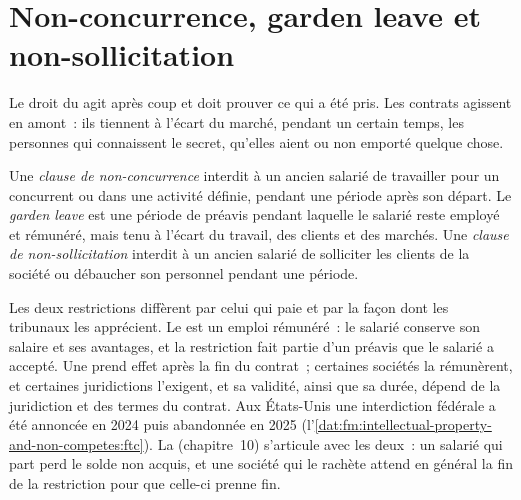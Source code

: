 \section{Non-concurrence, garden leave et non-sollicitation}

Le droit du  agit après coup et doit prouver ce qui a été pris. Les contrats agissent en amont~: ils tiennent à l'écart du
marché, pendant un certain temps, les personnes qui connaissent le secret, qu'elles aient ou non emporté quelque chose.

\begin{definition}\label{def:fm:intellectual-property-and-non-competes:restrict}
Une \emph{clause de non-concurrence} interdit à un ancien salarié de travailler pour un concurrent ou dans une activité définie, pendant une période
après son départ. Le \emph{garden leave} est une période de préavis pendant laquelle le salarié reste employé et rémunéré, mais tenu à l'écart
du travail, des clients et des marchés. Une \emph{clause de non-sollicitation} interdit à un ancien salarié de solliciter les clients de la
société ou débaucher son personnel pendant une période.
\end{definition}

Les deux restrictions diffèrent par celui qui paie et par la façon dont les tribunaux les apprécient. Le  est un emploi rémunéré~: le salarié conserve son salaire et ses avantages, et
la restriction fait partie d'un préavis que le salarié a accepté. Une  prend effet après la fin du contrat~; certaines sociétés la rémunèrent, et certaines
juridictions l'exigent, et sa validité, ainsi que sa durée, dépend de la juridiction et des termes du contrat. Aux États-Unis
une interdiction fédérale a été annoncée en 2024 puis abandonnée en 2025 (l'\cref{dat:fm:intellectual-property-and-non-competes:ftc}). La 
(chapitre~10) s'articule avec les deux~: un salarié qui part perd le solde non acquis, et une société qui le rachète attend en général la fin de la
restriction pour que celle-ci prenne fin.

